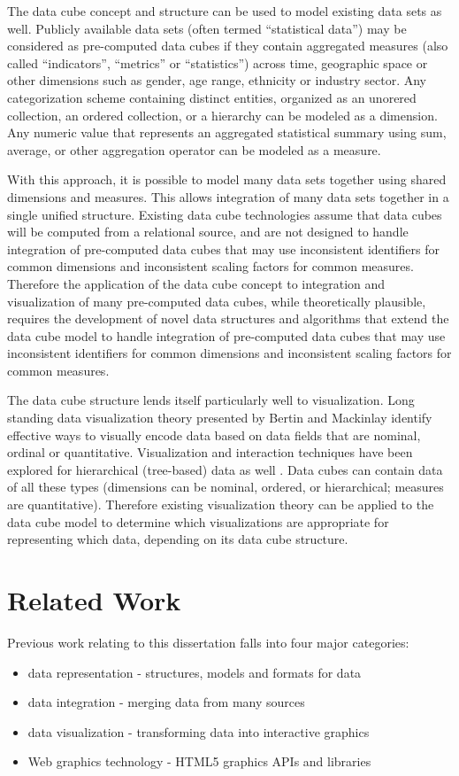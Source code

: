 The data cube concept and structure can be used to model existing data sets as well. Publicly available data sets (often termed ``statistical data'') may be considered as pre-computed data cubes if they contain aggregated measures (also called ``indicators'', ``metrics'' or ``statistics'') across time, geographic space or other dimensions such as gender, age range, ethnicity or industry sector. Any categorization scheme containing distinct entities, organized as an unorered collection, an ordered collection, or a hierarchy can be modeled as a dimension. Any numeric value that represents an aggregated statistical summary using sum, average, or other aggregation operator can be modeled as a measure.

With this approach, it is possible to model many data sets together using shared dimensions and measures. This allows integration of many data sets together in a single unified structure. Existing data cube technologies assume that data cubes will be computed from a relational source, and are not designed to handle integration of pre-computed data cubes that may use inconsistent identifiers for common dimensions and inconsistent scaling factors for common measures. Therefore the application of the data cube concept to integration and visualization of many pre-computed data cubes, while theoretically plausible, requires the development of novel data structures and algorithms that extend the data cube model to handle integration of pre-computed data cubes that may use inconsistent identifiers for common dimensions and inconsistent scaling factors for common measures.

The data cube structure lends itself particularly well to visualization. Long standing data visualization theory presented by Bertin \cite{bertin1983semiology} and Mackinlay \cite{mackinlay1986automating} identify effective ways to visually encode data based on data fields that are nominal, ordinal or quantitative. Visualization and interaction techniques have been explored for hierarchical (tree-based) data as well \cite{graham2010survey, yang2003interactive}. Data cubes can contain data of all these types (dimensions can be nominal, ordered, or hierarchical; measures are quantitative). Therefore existing visualization theory can be applied to the data cube model to determine which visualizations are appropriate for representing which data, depending on its data cube structure.

\pagebreak
\section{Related Work}
Previous work relating to this dissertation falls into four major categories:
\begin{itemize}
\item data representation - structures, models and formats for data
\item data integration - merging data from many sources
\item data visualization - transforming data into interactive graphics
\item Web graphics technology - HTML5 graphics APIs and libraries
\end{itemize}

